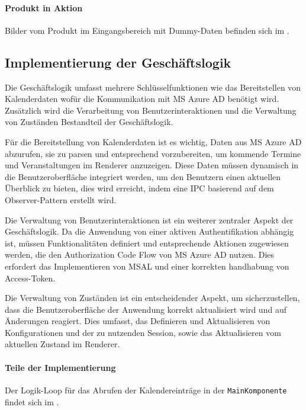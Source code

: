 \paragraph{Produkt in Aktion}
Bilder vom Produkt im Eingangsbereich mit Dummy-Daten befinden sich im .


\subsection{Implementierung der Geschäftslogik}
\label{sec:ImplementierungGeschaeftslogik}
Die Geschäftslogik umfasst mehrere Schlüsselfunktionen wie das Bereitstellen von Kalenderdaten wofür die Kommunikation mit \ac{MS} Azure \ac{AD} benötigt wird.
Zusätzlich wird die Verarbeitung von Benutzerinteraktionen und die Verwaltung von Zuständen Bestandteil der Geschäftslogik.


Für die Bereitstellung von Kalenderdaten ist es wichtig, Daten aus \ac{MS} Azure \ac{AD} abzurufen, sie zu parsen und entsprechend vorzubereiten, um kommende Termine und Veranstaltungen im Renderer anzuzeigen.
Diese Daten müssen dynamisch in die Benutzeroberfläche integriert werden, um den Benutzern einen aktuellen Überblick zu bieten, dies wird erreicht, indem eine \ac{IPC} basierend auf dem Observer-Pattern erstellt wird.


Die Verwaltung von Benutzerinteraktionen ist ein weiterer zentraler Aspekt der Geschäftslogik.
Da die Anwendung von einer aktiven Authentifikation abhängig ist, müssen Funktionalitäten definiert und entsprechende Aktionen zugewiesen werden, die den Authorization Code Flow von \ac{MS} Azure \ac{AD} nutzen.
Dies erfordert das Implementieren von \ac{MSAL} und einer korrekten handhabung von Access-Token.


Die Verwaltung von Zuständen ist ein entscheidender Aspekt, um sicherzustellen, dass die Benutzeroberfläche der Anwendung korrekt aktualisiert wird und auf Änderungen reagiert.
Dies umfasst, das Definieren und Aktualisieren von Konfigurationen und der zu nutzenden Session, sowie das Aktualisieren vom aktuellen Zustand im Renderer.


\paragraph{Teile der Implementierung}
Der Logik-Loop für das Abrufen der Kalendereinträge in der \texttt{Main\-Kom\-po\-nen\-te} findet sich im .
